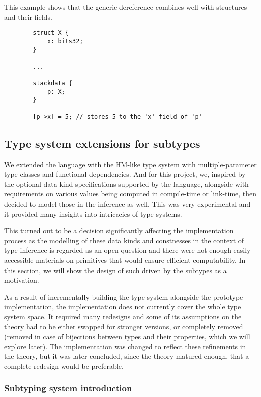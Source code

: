 \begin{ex}
    This example shows that the generic dereference combines well with structures and their fields.

    \begin{lstlisting}
        struct X {
            x: bits32;
        }

        ...

        stackdata {
            p: X;
        }

        [p->x] = 5; // stores 5 to the 'x' field of 'p'
    \end{lstlisting}
\end{ex}

\subsection{Type system extensions for \cmm{} subtypes}
\label{sec:typesystem}

We extended the language with the HM-like type system with multiple-parameter type classes and functional dependencies. And for this project, we, inspired by the optional data-kind specifications supported by the \cmm{} language, alongside with requirements on various values being computed in compile-time or link-time, then decided to model those in the inference as well. This was very experimental and it provided many insights into intricacies of type systems.

This turned out to be a decision significantly affecting the implementation process as the modelling of these data kinds and constnesses in the context of type inference is regarded as an open question and there were not enough easily accessible materials on primitives that would ensure efficient computability. In this section, we will show the design of such driven by the \cmm{} subtypes as a motivation.

As a result of incrementally building the type system alongside the prototype implementation, the implementation does not currently cover the whole type system space. It required many redesigns and some of its assumptions on the theory had to be either swapped for stronger versions, or completely removed (removed in case of bijections between types and their properties, which we will explore later). The implementation was changed to reflect these refinements in the theory, but it was later concluded, since the theory matured enough, that a complete redesign would be preferable.

\subsubsection{Subtyping system introduction}

